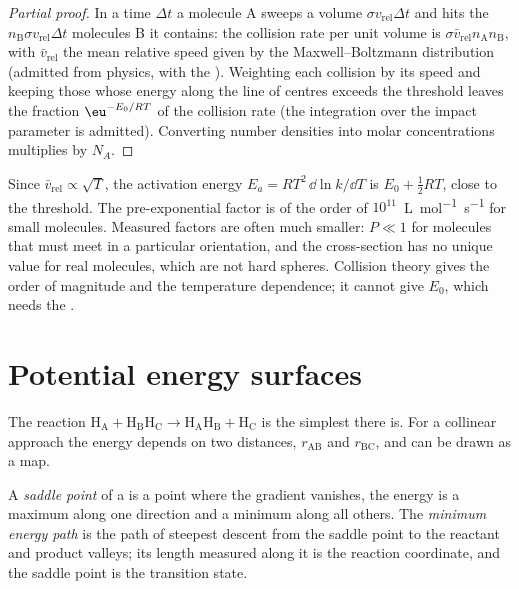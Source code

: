 \begin{proof}[Partial proof]
In a time $\Delta t$ a molecule A sweeps a volume $\sigma v_{\mathrm{rel}}\Delta t$ and hits the
$n_{\mathrm B}\sigma v_{\mathrm{rel}}\Delta t$ molecules B it contains: the collision rate per unit volume
is $\sigma\bar v_{\mathrm{rel}}n_{\mathrm A}n_{\mathrm B}$, with $\bar v_{\mathrm{rel}}$ the mean relative speed given by the
Maxwell--Boltzmann distribution (admitted from physics, with the ). Weighting each collision by its speed and keeping those whose energy
along the line of centres exceeds the threshold leaves the fraction
$\eu^{-E_0/RT}$ of the collision rate (the integration over the impact parameter is
admitted). Converting number densities into molar concentrations multiplies by
$N_A$.
\end{proof}

Since $\bar v_{\mathrm{rel}} \propto \sqrt T$, the activation energy $E_a = RT^2\,\dd\ln k/\dd T$ is $E_0 + \frac12RT$,
close to the threshold. The pre-exponential factor is of the order of
$10^{11}$~\unit{L.mol^{-1}.s^{-1}} for small molecules. Measured factors are often
much smaller: $P \ll 1$ for molecules that must meet in a particular
orientation, and the cross-section has no unique value for real molecules,
which are not hard spheres. Collision theory gives the order of magnitude and
the temperature dependence; it cannot give $E_0$, which needs the .

\section{Potential energy surfaces}

The reaction $\mathrm{H_A + H_BH_C \to H_AH_B + H_C}$ is the simplest there is. For a collinear
approach the energy depends on two distances, $r_{\mathrm{AB}}$ and $r_{\mathrm{BC}}$, and can be drawn
as a map.

\begin{definition}\label{def:b3:rate-theories:saddle}
A \emph{saddle point} of a  is a point
where the gradient vanishes, the energy is a maximum along one direction and a
minimum along all others. The \emph{minimum energy path} is the path of steepest descent from the saddle point to the reactant
and product valleys; its length measured along it is the reaction coordinate,
and the saddle point is the transition state.
\end{definition}

